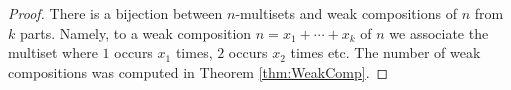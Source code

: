 

\setcounter{section}{3}
\setcounter{subsection}{6}
\setcounter{dfn}{15}

\begin{proof}
There is a bijection between $n$-multisets and weak compositions of $n$ from $k$ parts.
Namely, to a weak composition $n = x_1 + \cdots + x_k$ of $n$ we associate the multiset
where $1$ occurs $x_1$ times, $2$ occurs $x_2$ times etc.
The number of weak compositions was computed in Theorem \ref{thm:WeakComp}.
\end{proof}





